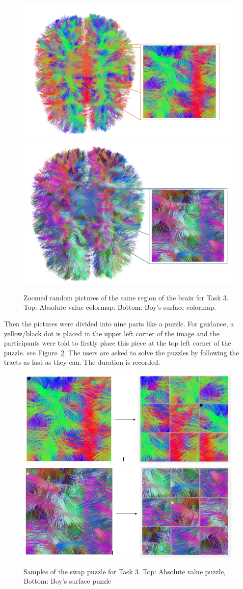 \documentclass[hyperref, plainreport, noproblem]{cgvpub1}
\begin{document}
\begin{figure}[ht]
    \centering
    \includegraphics[width = 0.49 \columnwidth]{absolute-zoomed}\\
    \includegraphics[width = 0.45 \columnwidth]{boy's-zoomed}
    \caption{Zoomed random pictures of the same region of the brain for Task 3. Top:  Absolute value colormap. Bottom: Boy's surface colormap.}
    \label{fig:absolute-zoomed}
\end{figure}

Then the pictures were divided into nine parts like a puzzle. For guidance, a yellow/black dot is placed in the upper left corner of the image and the participants were told to firstly place this piece at the top left corner of the puzzle. see Figure~\ref{fig:absolute-puzzle}. The users are asked to solve the puzzles by following the tracts as fast as they can. The duration is recorded. 

\begin{figure}[ht]
    \centering
    \includegraphics[width = 0.49 \columnwidth]{absolute-puzzle}\\
    \includegraphics[width = 0.48 \columnwidth]{boy's-puzzle}
    \caption{ Samples of the swap puzzle for Task 3. Top:  Absolute value puzzle, Bottom: Boy's surface puzzle}
    \label{fig:absolute-puzzle}
\end{figure}
\end{document}
